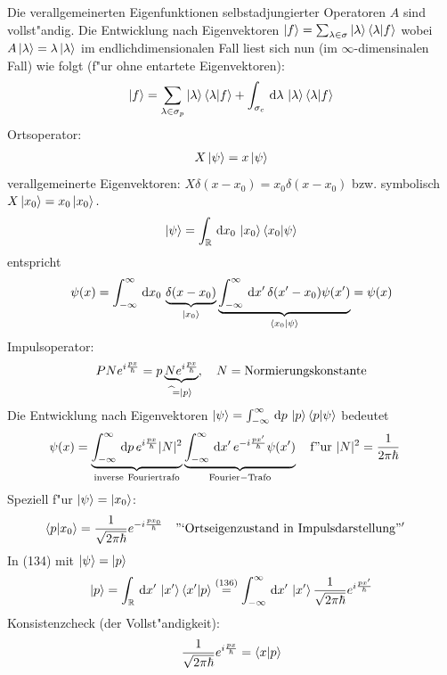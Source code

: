 \documentclass[a4paper]{scrartcl}
\newcommand{\RR}{\ensuremath \mathbb{R}}
\newcommand{\dd}{\ensuremath \, \mathrm{d}}
\begin{document}
{Die verallgemeinerten Eigenfunktionen selbstadjungierter Operatoren $A$ sind vollst"andig. Die Entwicklung nach Eigenvektoren $ \ket{f} = \sum_{\lambda \in \sigma} \ket{\lambda} \braket{ \lambda | f }$ wobei $A \ket{\lambda} = \lambda \ket \lambda$ im endlichdimensionalen Fall liest sich nun (im $\infty$-dimensinalen Fall) wie folgt (f"ur ohne entartete Eigenvektoren):
\begin{align}
\ket f = \sum_{\lambda \in \sigma_p} \ket \lambda \braket{ \lambda | f} + \int_{\sigma_c} \dd \lambda \, \ket \lambda \braket{ \lambda | f}
\end{align}
Ortsoperator:
\begin{align} X \ket \psi = x \ket \psi \end{align}
verallgemeinerte Eigenvektoren: $X \delta(x-x_0) = x_0 \delta(x-x_0)$ bzw. symbolisch $X \ket{x_0} = x_0 \ket{x_0}.$
\begin{align}
\ket \psi = \int_\RR \dd x_0 \, \ket {x_0} \braket{ x_0 | \psi}
\end{align}
entspricht
$$ \psi(x) = \int_{-\infty}^\infty \dd x_0 \, \underbrace{ \delta(x-x_0) }_{\ket{x_0}} \underbrace{\int_{-\infty}^\infty \dd x' \, \delta(x' - x_0) \psi(x')}_{\braket{ x_0 | \psi}} = \psi(x)$$
Impulsoperator:
$$P  N e^{i \frac {px}{\hbar}} = p \underbrace{ N e^{i \frac{px} \hbar}}_{\widehat \, = \ket p}, \quad N    =  \mathrm{ Normierungskonstante}$$
Die Entwicklung nach Eigenvektoren $\ket \psi = \int_{-\infty}^\infty \dd p \, \ket p \braket{ p | \psi}$ bedeutet
\begin{align}
\psi(x) & = \underbrace{ \int_{-\infty}^\infty \dd p \, e^{i \frac {px}\hbar} \vert N \vert^2 }_{\mathrm{inverse \ Fouriertrafo}} \underbrace{ \int_{-\infty}^\infty \dd x' \,  e^{- i \frac{px'} \hbar} \psi(x') }_{\mathrm{Fourier-Trafo}} \quad \mathrm{f"ur \ } \vert N \vert ^2 = \frac 1 {2 \pi \hbar}
\end{align}
Speziell f"ur $\ket \psi = \ket {x_0}$:
\begin{align}
\braket {p | x_0} & = \frac1{\sqrt{2 \pi \hbar}} e^{- i \frac {p x_0}\hbar} \quad \mathrm{"`Ortseigenzustand \ in \ Impulsdarstellung"'}
\end{align}
In (134) mit $\ket \psi = \ket p$
$$ \ket p = \int_\RR \dd x' \, \ket {x'} \braket{ x' | p} \stackrel{(136)}= \int_{-\infty}^\infty \dd x' \, \ket{ x'} \frac1{\sqrt{2\pi\hbar}} e^{i \frac{px'}\hbar}$$
Konsistenzcheck (der Vollst"andigkeit):
\begin{align}
\begin{split}
\frac1{\sqrt{2\pi\hbar}} e^{i \frac{px}\hbar} & = \braket{ x | p } \\

\end{split}
\end{align}}
\end{document}
